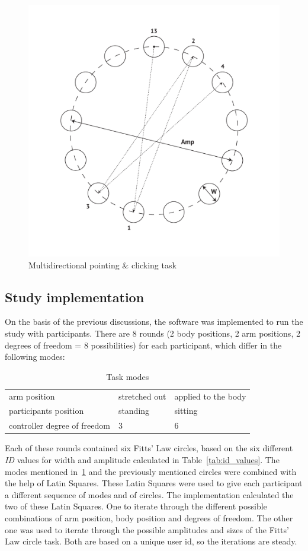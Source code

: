 \begin{figure}[h]
    \centering
    \includegraphics[width=.7\columnwidth]{graphics/fitts_law_circle.pdf}
    \caption{Multidirectional pointing \& clicking task}
    \label{fig:pointing_task}
\end{figure}

\subsection{Study implementation}

On the basis of the previous discussions, the software was implemented to run the study with participants. There are 8 rounds (2 body positions, 2 arm positions, 2 degrees of freedom = 8 possibilities) for each participant, which differ in the following modes:

\begin{table}[h]
    \centering
    \begin{tabular}{|p{5cm}||p{3cm}|p{3cm}|}
    \hline
    arm position & stretched out & applied to the body \\
    participants position & standing & sitting \\
    controller degree of freedom & 3 & 6 \\
    \hline
    \end{tabular}
    \caption{Task modes}
    \label{tab:task_modes}
\end{table}

Each of these rounds contained six Fitts' Law circles, based on the six different \textit{ID} values for width and amplitude calculated in Table~\ref{tab:id_values}. The modes mentioned in~\ref{tab:task_modes} and the previously mentioned circles were combined with the help of Latin Squares. These Latin Squares were used to give each participant a different sequence of modes and of circles. The implementation calculated the two of these Latin Squares. One to iterate through the different possible combinations of arm position, body position and degrees of freedom. The other one was used to iterate through the possible amplitudes and sizes of the Fitts' Law circle task. Both are based on a unique user id, so the iterations are steady.

